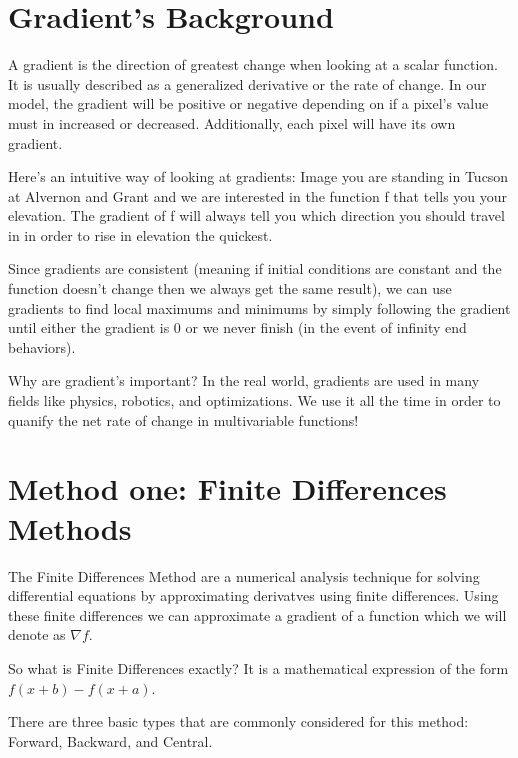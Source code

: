 \documentclass[letterpaper,10pt,english]{jupyterBook}
\begin{document}
\section{Gradient’s Background}
\label{\detokenize{finite_gradient:gradient-s-background}}
\sphinxAtStartPar
A gradient is the direction of greatest change when looking at a scalar function. It is usually described as a generalized derivative or the rate of change. In our model, the gradient will be positive or negative depending on if a pixel’s value must in increased or decreased. Additionally, each pixel will have its own gradient.

\sphinxAtStartPar
Here’s an intuitive way of looking at gradients: Image you are standing in Tucson at Alvernon and Grant and we are interested in the function f that tells you your elevation. The gradient of f will always tell you which direction you should travel in in order to rise in elevation the quickest.

\sphinxAtStartPar
Since gradients are consistent (meaning if initial conditions are constant and the function doesn’t change then we always get the same result), we can use gradients to find local maximums and minimums by simply following the gradient until either the gradient is 0 or we never finish (in the event of infinity end behaviors).

\sphinxAtStartPar
Why are gradient’s important? In the real world, gradients are used in many fields like physics, robotics, and optimizations. We use it all the time in order to quanify the net rate of change in multi\sphinxhyphen{}variable functions!


\section{Method one: Finite Differences Methods}
\label{\detokenize{finite_gradient:method-one-finite-differences-methods}}
\sphinxAtStartPar
The Finite Differences Method are a numerical analysis technique for solving differential equations by approximating derivatves using finite differences. Using these finite differences we can approximate a gradient of a function which we will denote as \(\nabla f\).

\sphinxAtStartPar
So what is Finite Differences exactly? It is a mathematical expression of the form \(f(x+b)-f(x+a)\).

\sphinxAtStartPar
There are three basic types that are commonly considered for this method: Forward, Backward, and Central.
\end{document}
